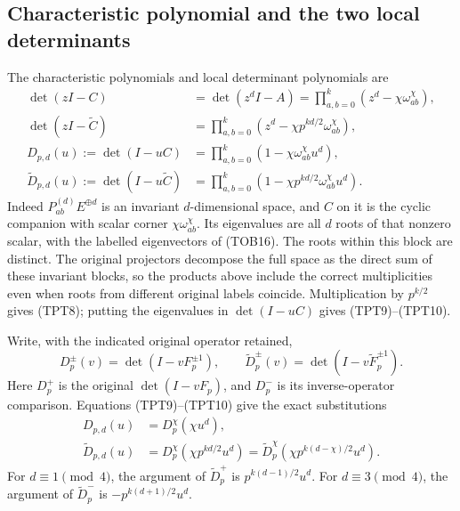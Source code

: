 \subsection{Characteristic polynomial and the two local determinants}

The characteristic polynomials and local determinant polynomials are
\begin{align}
 \det(zI-C)&=\det(z^dI-A)
      =\prod_{a,b=0}^k(z^d-\chi\omega_{ab}^{\chi}),\tag{TPT7}\\
 \det(zI-\widetilde C)&=
      \prod_{a,b=0}^k(z^d-\chi p^{kd/2}\omega_{ab}^{\chi}),\tag{TPT8}\\
 D_{p,d}(u):=\det(I-uC)&=
      \prod_{a,b=0}^k(1-\chi\omega_{ab}^{\chi}u^d),\tag{TPT9}\\
 \widetilde D_{p,d}(u):=\det(I-u\widetilde C)&=
      \prod_{a,b=0}^k(1-\chi p^{kd/2}\omega_{ab}^{\chi}u^d).
      \tag{TPT10}
\end{align}
Indeed $P_{ab}^{(d)}E^{\oplus d}$ is an invariant $d$-dimensional
space, and $C$ on it is the cyclic companion with scalar corner
$\chi\omega_{ab}^{\chi}$. Its eigenvalues are all $d$ roots of that
nonzero scalar, with the labelled eigenvectors of (TOB16). The roots
within this block are distinct. The original projectors decompose
the full space as the direct sum of these invariant blocks, so the
products above include the correct multiplicities even when roots
from different original labels coincide. Multiplication by $p^{k/2}$
gives (TPT8); putting the eigenvalues in $\det(I-uC)$ gives
(TPT9)--(TPT10).

Write, with the indicated original operator retained,
\begin{equation}\tag{TPT11}
 D_p^{\pm}(v)=\det(I-vF_p^{\pm1}),\qquad
 \widetilde D_p^{\pm}(v)=\det(I-v\widetilde F_p^{\pm1}).
\end{equation}
Here $D_p^+$ is the original $\det(I-vF_p)$, and $D_p^-$ is its
inverse-operator comparison. Equations (TPT9)--(TPT10) give the exact
substitutions
\begin{equation}\tag{TPT12}
 \begin{split}
 D_{p,d}(u)&=D_p^{\chi}(\chi u^d),\\
 \widetilde D_{p,d}(u)
   &=D_p^{\chi}(\chi p^{kd/2}u^d)
    =\widetilde D_p^{\chi}(\chi p^{k(d-\chi)/2}u^d).
 \end{split}
\end{equation}
For $d\equiv1\pmod4$, the argument of $\widetilde D_p^+$ is
$p^{k(d-1)/2}u^d$. For $d\equiv3\pmod4$, the argument of
$\widetilde D_p^-$ is $-p^{k(d+1)/2}u^d$.

